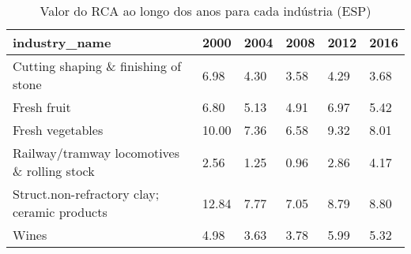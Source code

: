 \begin{table}
\centering
\caption{Valor do RCA ao longo dos anos para cada indústria (ESP)}
\begin{tabular}{p{6cm}p{1.5cm}p{1.5cm}p{1.5cm}p{1.5cm}p{1.5cm}}
\toprule
                               industry\_name &  2000 & 2004 & 2008 & 2012 & 2016 \\
\midrule
        Cutting shaping \& finishing of stone &  6.98 & 4.30 & 3.58 & 4.29 & 3.68 \\
                                 Fresh fruit &  6.80 & 5.13 & 4.91 & 6.97 & 5.42 \\
                            Fresh vegetables & 10.00 & 7.36 & 6.58 & 9.32 & 8.01 \\
 Railway/tramway locomotives \& rolling stock &  2.56 & 1.25 & 0.96 & 2.86 & 4.17 \\
Struct.non-refractory clay; ceramic products & 12.84 & 7.77 & 7.05 & 8.79 & 8.80 \\
                                       Wines &  4.98 & 3.63 & 3.78 & 5.99 & 5.32 \\
\bottomrule
\end{tabular}
\end{table}
